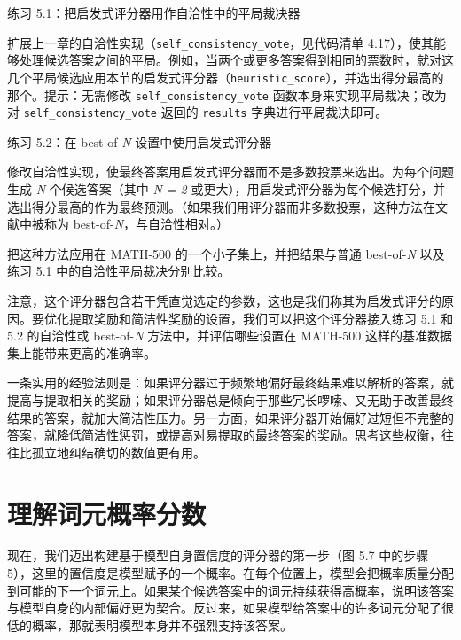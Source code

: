 \begin{mySidebar}{练习 5.1：把启发式评分器用作自洽性中的平局裁决器}

扩展上一章的自洽性实现（\texttt{self\_consistency\_vote}，见代码清单 4.17），使其能够处理候选答案之间的平局。例如，当两个或更多答案得到相同的票数时，就对这几个平局候选应用本节的启发式评分器（\texttt{heuristic\_score}），并选出得分最高的那个。提示：无需修改 \texttt{self\_consistency\_vote} 函数本身来实现平局裁决；改为对 \texttt{self\_consistency\_vote} 返回的 \texttt{results} 字典进行平局裁决即可。

\end{mySidebar}

\begin{mySidebar}{练习 5.2：在 best-of-\emph{N} 设置中使用启发式评分器}

修改自洽性实现，使最终答案用启发式评分器而不是多数投票来选出。为每个问题生成 \emph{N }个候选答案（其中 \emph{N = 2 }或更大），用启发式评分器为每个候选打分，并选出得分最高的作为最终预测。（如果我们用评分器而非多数投票，这种方法在文献中被称为 best-of-\emph{N}，与自洽性相对。）

把这种方法应用在 MATH-500 的一个小子集上，并把结果与普通 best-of-\emph{N} 以及练习 5.1 中的自洽性平局裁决分别比较。

\end{mySidebar}

注意，这个评分器包含若干凭直觉选定的参数，这也是我们称其为启发式评分的原因。要优化提取奖励和简洁性奖励的设置，我们可以把这个评分器接入练习 5.1 和 5.2 的自洽性或 best-of-\emph{N} 方法中，并评估哪些设置在 MATH-500 这样的基准数据集上能带来更高的准确率。

一条实用的经验法则是：如果评分器过于频繁地偏好最终结果难以解析的答案，就提高与提取相关的奖励；如果评分器总是倾向于那些冗长啰嗦、又无助于改善最终结果的答案，就加大简洁性压力。另一方面，如果评分器开始偏好过短但不完整的答案，就降低简洁性惩罚，或提高对易提取的最终答案的奖励。思考这些权衡，往往比孤立地纠结确切的数值更有用。

\section{理解词元概率分数}

现在，我们迈出构建基于模型自身置信度的评分器的第一步（图 5.7 中的步骤 5），这里的置信度是模型赋予的一个概率。在每个位置上，模型会把概率质量分配到可能的下一个词元上。如果某个候选答案中的词元持续获得高概率，说明该答案与模型自身的内部偏好更为契合。反过来，如果模型给答案中的许多词元分配了很低的概率，那就表明模型本身并不强烈支持该答案。

